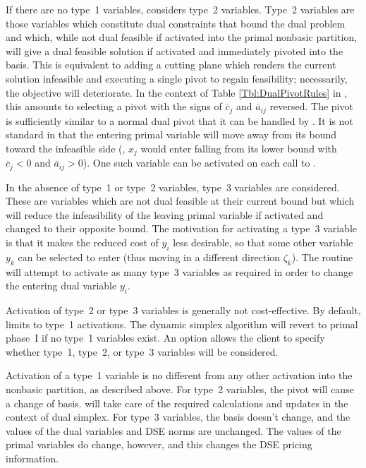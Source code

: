 If there are no type~1 variables,  considers type~2
variables.
Type~2 variables are those variables which constitute dual constraints that
bound the dual problem and which, while not dual feasible if activated into
the primal nonbasic partition, will give a dual feasible solution if
activated and immediately pivoted into the basis.
This is equivalent to adding a cutting plane which renders the current
solution infeasible and executing a single pivot to regain feasibility;
necessarily, the objective will deteriorate.
In the context of Table \ref{Tbl:DualPivotRules}
in ,
this amounts to
selecting a pivot with the signs of $\overline{c}_j$ and $\overline{a}_{ij}$
reversed.
The pivot is sufficiently similar to a normal dual pivot that it can be
handled by .
It is not standard in that the entering primal variable will move
away from its bound toward the infeasible side (\eg, $x_j$ would enter falling
from its lower bound with $\overline{c}_j < 0$ and $\overline{a}_{ij} > 0$).
One such variable can be activated on each call to .

In the absence of type~1 or type~2 variables, type~3 variables are considered.
These are variables which are not dual feasible at their current
bound but which will reduce the infeasibility of the leaving primal variable
if activated and changed to their opposite bound.
The motivation for activating a type~3 variable is that it makes the reduced
cost of $y_i$ less desirable, so that some other variable $y_k$ can be
selected to enter (thus moving in a different direction $\zeta_k$).
The routine  will attempt to activate as many type~3
variables as required in order to change the entering dual variable $y_i$.

Activation of type~2 or type~3 variables is generally not cost-effective.
By default, \dylp limits  to type~1 activations.
The dynamic simplex algorithm will revert to primal phase~I if no
type~1 variables exist.
An option allows the client to specify whether type~1, type~2, or type~3
variables will be considered.

Activation of a type~1 variable is no different from any other activation into
the nonbasic partition, as described above.
For type~2 variables, the pivot will cause a change of basis.
 will take care of the required calculations and updates
in the context of dual simplex.
For type~3 variables, the basis doesn't change, and the values of the dual
variables and DSE norms are unchanged.
The values of the primal variables do change, however, and this changes the
DSE pricing information.


